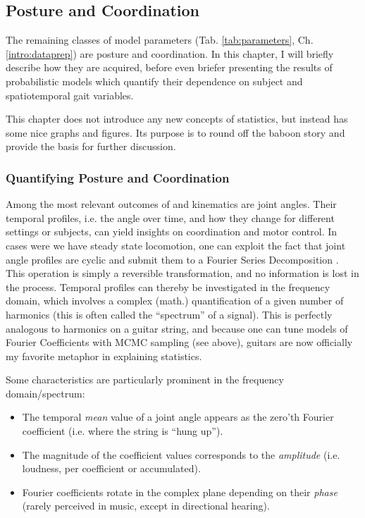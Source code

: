 \FloatBarrier\clearpage
\subsection{Posture and Coordination}
\label{sec:orgc82aa48}
The remaining classes of model parameters (Tab. \ref{tab:parameters}, Ch. \ref{intro:dataprep}) are posture and coordination.
In this chapter, I will briefly describe how they are acquired, before even briefer presenting the results of probabilistic models which quantify their dependence on subject and spatiotemporal gait variables.


This chapter does not introduce any new concepts of statistics, but instead has some nice graphs and figures.
Its purpose is to round off the baboon story and provide the basis for further discussion.


\subsubsection{Quantifying Posture and Coordination}
\label{sec:orgb18a99b}
Among the most relevant outcomes of  and kinematics are joint angles.
Their temporal profiles, i.e. the  angle over time, and how they change for different settings or subjects, can yield insights on coordination and motor control.
In cases were we have steady state locomotion, one can exploit the fact that joint angle profiles are cyclic and submit them to a Fourier Series Decomposition \citep[\emph{cf.}][]{Mielke2019}.
This operation is simply a reversible transformation, and no information is lost in the process.
Temporal profiles can thereby be investigated in the frequency domain, which involves a complex (math.) quantification of a given number of harmonics (this is often called the ``spectrum'' of a signal).
This is perfectly analogous to harmonics on a guitar string, and because one can tune models of Fourier Coefficients with MCMC sampling (see above), guitars are now officially my favorite metaphor in explaining statistics.

Some characteristics are particularly prominent in the frequency domain/spectrum:
\begin{itemize}
\item The temporal \emph{mean} value of a joint angle appears as the zero'th Fourier coefficient (i.e. where the string is ``hung up'').
\item The magnitude of the coefficient values corresponds to the \emph{amplitude} (i.e. loudness, per coefficient or accumulated).
\item Fourier coefficients rotate in the complex plane depending on their \emph{phase} (rarely perceived in music, except in directional hearing).
\end{itemize}


